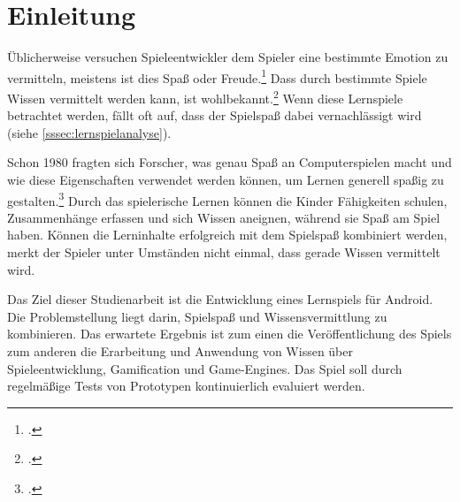 \section{Einleitung}
	Üblicherweise versuchen Spieleentwickler dem Spieler eine bestimmte Emotion zu vermitteln, meistens ist dies Spaß oder Freude.\footcite[Abstract]{persona} Dass durch bestimmte Spiele Wissen vermittelt werden kann, ist wohlbekannt.\footcite{generalgameandlearning} Wenn diese Lernspiele betrachtet werden, fällt oft auf, dass der Spielspaß dabei vernachlässigt wird (siehe \ref{sssec:lernspielanalyse}).

	Schon 1980 fragten sich Forscher, was genau Spaß an Computerspielen macht und wie diese Eigenschaften verwendet werden können, um Lernen generell spaßig zu gestalten.\footcite{learn-game-history} Durch das spielerische Lernen können die Kinder Fähigkeiten schulen, Zusammenhänge erfassen und sich Wissen aneignen, während sie Spaß am Spiel haben. Können die Lerninhalte erfolgreich mit dem Spielspaß kombiniert werden, merkt der Spieler unter Umständen nicht einmal, dass gerade Wissen vermittelt wird.

	Das Ziel dieser Studienarbeit ist die Entwicklung eines Lernspiels für Android. Die Problemstellung liegt darin, Spielspaß und Wissensvermittlung zu kombinieren. Das erwartete Ergebnis ist zum einen die Veröffentlichung des Spiels zum anderen die Erarbeitung und Anwendung von Wissen über Spieleentwicklung, Gamification und Game-Engines. Das Spiel soll durch regelmäßige Tests von Prototypen kontinuierlich evaluiert werden.

